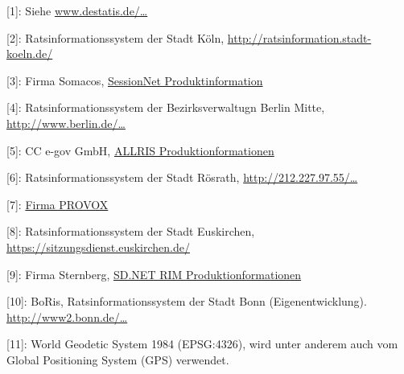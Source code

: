 \documentclass[,a4paper]{article}
\begin{document}
{[}1{]}: Siehe
\href{https://www.destatis.de/DE/Methoden/Klassifikationen/Bevoelkerung/StaatsangehoerigkeitGebietsschluessel.html}{www.destatis.de/\ldots{}}

{[}2{]}: Ratsinformationssystem der Stadt Köln,
\href{http://ratsinformation.stadt-koeln.de/}{http://ratsinformation.stadt-koeln.de/}

{[}3{]}: Firma Somacos,
\href{http://www.somacos.de/de/sitzungsdienst/ratsinfo.html}{SessionNet
Produktinformation}

{[}4{]}: Ratsinformationssystem der Bezirksverwaltugn Berlin Mitte,
\href{http://www.berlin.de/ba-mitte/bvv-online/allris.net.asp}{http://www.berlin.de/\ldots{}}

{[}5{]}: CC e-gov GmbH, \href{http://www.cc-egov.de/allris.htm}{ALLRIS
Produktionformationen}

{[}6{]}: Ratsinformationssystem der Stadt Rösrath,
\href{http://212.227.97.55/ratsinfo/roesrath}{http://212.227.97.55/\ldots{}}

{[}7{]}: \href{http://www.provox.de/}{Firma PROVOX}

{[}8{]}: Ratsinformationssystem der Stadt Euskirchen,
\href{https://sitzungsdienst.euskirchen.de/}{https://sitzungsdienst.euskirchen.de/}

{[}9{]}: Firma Sternberg,
\href{http://www.sitzungsdienst.net/produkte/ratsinformationsmanagement}{SD.NET
RIM Produktionformationen}

{[}10{]}: BoRis, Ratsinformationssystem der Stadt Bonn
(Eigenentwicklung).
\href{http://www2.bonn.de/bo\_ris/ris\_sql/agm\_index.asp}{http://www2.bonn.de/\ldots{}}

{[}11{]}: World Geodetic System 1984 (EPSG:4326), wird unter anderem
auch vom Global Positioning System (GPS) verwendet.
\end{document}
